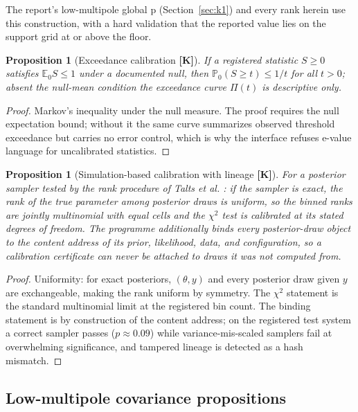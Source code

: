 \documentclass[10pt]{article}
\newtheorem{proposition}[theorem]{Proposition}
\theoremstyle{definition}
\newcommand{\tier}[1]{\textbf{[#1]}}
\begin{document}
The report's low-multipole global p (Section~\ref{sec:k1}) and every
rank herein use this construction, with a hard validation that the
reported value lies on the support grid at or above the floor.

\begin{proposition}[Exceedance calibration \tier{K}]
\label{prop:evalue}
If a registered statistic $S \ge 0$ satisfies $\mathbb E_0 S \le 1$
under a documented null, then $\mathbb P_0(S \ge t) \le 1/t$ for all
$t > 0$; absent the null-mean condition the exceedance curve $\Pi(t)$
is descriptive only.
\end{proposition}
\begin{proof}
Markov's inequality under the null measure. The proof requires the
null expectation bound; without it the same curve summarizes observed
threshold exceedance but carries no error control, which is why the
interface refuses e-value language for uncalibrated statistics.
\end{proof}

\begin{proposition}[Simulation-based calibration with lineage
\tier{K}]
\label{prop:sbc}
For a posterior sampler tested by the rank procedure of Talts et al. \cite{Talts2018}:
if the sampler is exact, the rank of the true parameter among
posterior draws is uniform, so the binned ranks are jointly
multinomial with equal cells and the $\chi^2$ test is calibrated at
its stated degrees of freedom. The programme additionally binds every
posterior-draw object to the content address of its prior,
likelihood, data, and configuration, so a calibration certificate can
never be attached to draws it was not computed from.
\end{proposition}
\begin{proof}
Uniformity: for exact posteriors, $(\theta, y)$ and every posterior
draw given $y$ are exchangeable, making the rank uniform by symmetry.
The $\chi^2$ statement is the standard multinomial limit at the
registered bin count. The binding statement is by construction of the
content address; on the registered test system a correct sampler
passes ($p \approx 0.09$) while variance-mis-scaled samplers fail at
overwhelming significance, and tampered lineage is detected as a hash
mismatch.
\end{proof}

\subsection{Low-multipole covariance propositions}
\end{document}
